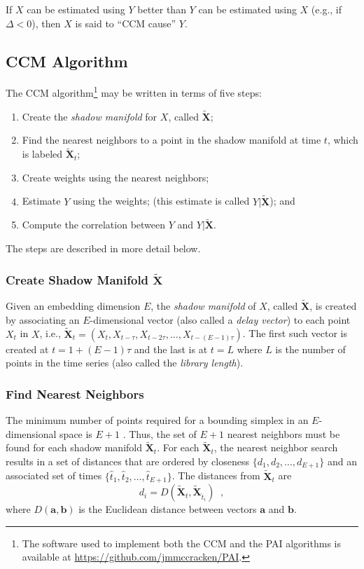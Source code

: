 \documentclass[twocolumn,aps,pre,groupedaddress]{revtex4-1}
\begin{document}
If $X$ can be estimated using $Y$ better than $Y$ can be estimated using $X$ (e.g., if $\Delta < 0$), then $X$ is said to ``CCM cause'' $Y$.

\subsection{CCM Algorithm}
\label{sec:appA}
The CCM algorithm\footnote{The software used to implement both the CCM and the PAI algorithms is available at \protect\url{https://github.com/jmmccracken/PAI}.} may be written in terms of five steps:
\begin{enumerate}
\item 
Create the {\em shadow manifold} for $X$, called $\tilde{\mathbf{X}}$;
\item Find the nearest neighbors to a point in the shadow manifold at time $t$, which is labeled $\tilde{\mathbf{X}}_t$;
\item Create weights using the nearest neighbors;
\item Estimate $Y$ using the weights; (this estimate is called $Y|\tilde{\mathbf{X}}$); and
\item Compute the correlation between $Y$ and $Y|\tilde{\mathbf{X}}$. 
\end{enumerate}
The steps are described in more detail below.  

\subsubsection{Create Shadow Manifold $\tilde{\mathbf{X}}$}
\label{sec:shadow}
Given an embedding dimension $E$, the {\em shadow manifold} of $X$, called $\tilde{\mathbf{X}}$, is created by associating an $E$-dimensional vector (also called a {\em delay vector}) to each point $X_t$ in $X$, i.e., $\tilde{\mathbf{X}}_t=\left(X_t,X_{t-\tau},X_{t-2\tau},\ldots,X_{t-(E-1)\tau}\right)$.  The first such vector is created at $t=1+(E-1)\tau$ and the last is at $t=L$ where $L$ is the number of points in the time series (also called the {\em library length}).  

\subsubsection{Find Nearest Neighbors}
The minimum number of points required for a bounding simplex in an $E$-dimensional space is $E+1$ \cite{Sugihara1990,Sugihara1990a}.  Thus,  the set of $E+1$ nearest neighbors must be found for each shadow manifold $\tilde{\mathbf{X}}_t$.  For each $\tilde{\mathbf{X}}_t$, the nearest neighbor search results in a set of distances that are ordered by closeness $\{d_1,d_2,\ldots,d_{E+1}\}$ and an associated set of times $\{\hat{t}_1,\hat{t}_2,\ldots,\hat{t}_{E+1}\}$.  The distances from $\tilde{\mathbf{X}}_t$ are
$$
d_i = D\left(\tilde{\mathbf{X}}_t,\tilde{\mathbf{X}}_{\hat{t}_i}\right)\;\;,
$$
where $D(\mathbf{a},\mathbf{b})$ is the Euclidean distance between vectors $\mathbf{a}$ and $\mathbf{b}$.
\end{document}
